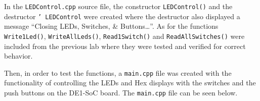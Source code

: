 \documentclass[
	letterpaper, %
	10pt, %
]{CSUniSchoolLabReport}
\begin{document}





  In the \texttt{LEDControl.cpp} source file, the constructor \texttt{LEDControl()} and the destructor \texttt{\char'~LEDControl} were created where the destructor also displayed a message ``Closing LEDs, Switches, \& Buttons\ldots''. As for the functions \texttt{Write1Led()}, \texttt{WriteAllLeds()}, \texttt{Read1Switch()} and \texttt{ReadAllSwitches()} were included from the previous lab where they were tested and verified for correct behavior.  

  Then, in order to test the functions, a \texttt{main.cpp} file was created with the functionality of controlling the LEDs and Hex displays with the switches and the push buttons on the DE1-SoC board. The \texttt{main.cpp} file can be seen below.


\end{document}
